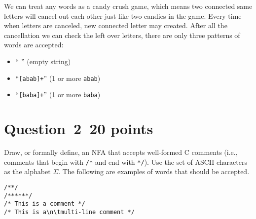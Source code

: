 \documentclass[10pt]{article}
\begin{document}
\begin{framed}
We can treat any words as a candy crush game, 
which means two connected same letters will cancel out each other
just like two candies in the game.
Every time when letters are canceled,
new connected letter may created.
After all the cancellation we can check the left over letters,
there are only three patterns of words are accepted:
\begin{itemize}
	\item `` '' (empty string)
	\item ``{\tt [abab]+}'' (1 or more {\tt abab})
	\item ``{\tt [baba]+}'' (1 or more {\tt baba})
\end{itemize}
\end{framed}

\section*{Question~2~\hfill 20 points}

Draw, or formally define, 
an NFA that accepts well-formed C comments
(i.e., comments that begin with \verb|/*|
and end with \verb|*/|).
Use the set of ASCII characters as the alphabet $\Sigma$.
The following are examples of words that should be accepted.
\begin{verbatim}
/**/
/******/
/* This is a comment */
/* This is a\n\tmulti-line comment */
\end{verbatim}

\begin{framed}
\begin{center}
\end{center}
\end{framed}
\end{document}
